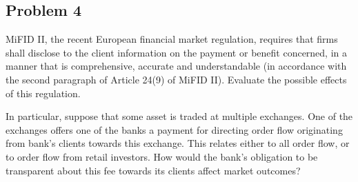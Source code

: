 \documentclass[11pt
, answers
]{exam}
\begin{document}
\quad
\subsection*{Problem 4}

MiFID II, the recent European financial market regulation, requires that firms shall disclose to the client information on the payment or benefit concerned, in a manner that is comprehensive, accurate and understandable (in accordance with the second paragraph of Article 24(9) of MiFID II). Evaluate the possible effects of this regulation.

In particular, suppose that some asset is traded at multiple exchanges. One of the exchanges offers one of the banks a payment for directing order flow originating from bank's clients towards this exchange. This relates either to all order flow, or to order flow from retail investors. How would the bank's obligation to be transparent about this fee towards its clients affect market outcomes?

\end{document}

